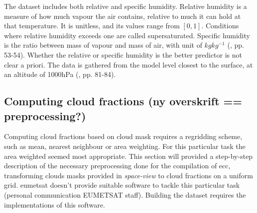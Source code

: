 The dataset includes both relative and specific humidity. Relative humidity is a measure of how much vapour the air contains, relative to much it can hold at that temperature. It is unitless, and its values range from $\left[ 0, 1 \right]$.  Conditions where relative humidity exceeds one are called supersaturated. Specific humidity is the ratio between mass of vapour and mass of air, with unit of $kg kg^{-1}$ (\cite{lohmann2016}, pp. 53-54). Whether the relative or specific humidity is the better predictor is not clear a priori. The data is gathered from the model level closest to the surface, at an altitude of 1000hPa (\cite{lohmann2016}, pp. 81-84). 

\subsection{Computing cloud fractions (ny overskrift == preprocessing?)} \label{sec:remapping}

Computing cloud fractions based on cloud mask requires a regridding scheme, such as mean, nearest neighbour or area weighting. For this particular task the area weighted seemed most appropriate. This section will provided a step-by-step description of the necessary preprocessing done for the compilation of \acrshort{ecc}, transforming clouds masks provided in \textit{space-view} to cloud fractions on a uniform grid. \acrshort{eumetsat} doesn't provide suitable software to tackle this particular task (personal communication EUMETSAT staff). Building the dataset requires the implementations of this software.


